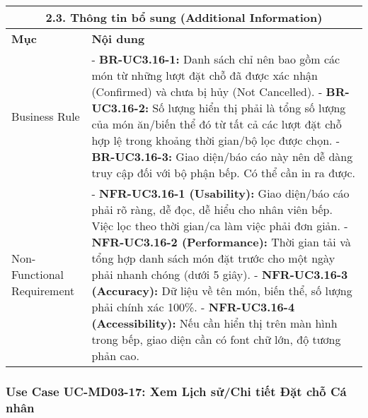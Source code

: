 \begin{longtable}{|m{4cm}|p{11cm}|}
\hline
\multicolumn{2}{|c|}{\textbf{2.3. Thông tin bổ sung (Additional Information)}} \\
\hline
\textbf{Mục} & \textbf{Nội dung} \\
\hline
Business Rule & - \textbf{BR-UC3.16-1:} Danh sách chỉ nên bao gồm các món từ những lượt đặt chỗ đã được xác nhận (Confirmed) và chưa bị hủy (Not Cancelled). \newline - \textbf{BR-UC3.16-2:} Số lượng hiển thị phải là tổng số lượng của món ăn/biến thể đó từ tất cả các lượt đặt chỗ hợp lệ trong khoảng thời gian/bộ lọc được chọn. \newline - \textbf{BR-UC3.16-3:} Giao diện/báo cáo này nên dễ dàng truy cập đối với bộ phận bếp. Có thể cần in ra được. \\
\hline
Non-Functional Requirement & - \textbf{NFR-UC3.16-1 (Usability):} Giao diện/báo cáo phải rõ ràng, dễ đọc, dễ hiểu cho nhân viên bếp. Việc lọc theo thời gian/ca làm việc phải đơn giản. \newline - \textbf{NFR-UC3.16-2 (Performance):} Thời gian tải và tổng hợp danh sách món đặt trước cho một ngày phải nhanh chóng (dưới 5 giây). \newline - \textbf{NFR-UC3.16-3 (Accuracy):} Dữ liệu về tên món, biến thể, số lượng phải chính xác 100\%. \newline - \textbf{NFR-UC3.16-4 (Accessibility):} Nếu cần hiển thị trên màn hình trong bếp, giao diện cần có font chữ lớn, độ tương phản cao. \\
\hline
\end{longtable}

\subsubsection{Use Case UC-MD03-17: Xem Lịch sử/Chi tiết Đặt chỗ Cá nhân}

